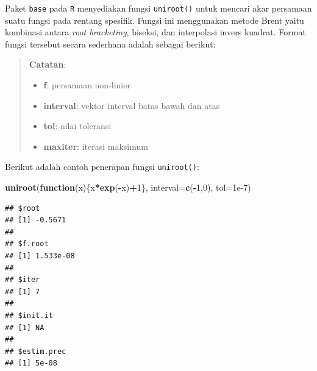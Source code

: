 \documentclass[
]{book}
\newenvironment{Shaded}{\begin{snugshade}}{\end{snugshade}}
\newcommand{\AttributeTok}[1]{\textcolor[rgb]{0.13,0.29,0.53}{#1}}
\newcommand{\ControlFlowTok}[1]{\textcolor[rgb]{0.13,0.29,0.53}{\textbf{#1}}}
\newcommand{\DecValTok}[1]{\textcolor[rgb]{0.00,0.00,0.81}{#1}}
\newcommand{\FloatTok}[1]{\textcolor[rgb]{0.00,0.00,0.81}{#1}}
\newcommand{\FunctionTok}[1]{\textcolor[rgb]{0.13,0.29,0.53}{\textbf{#1}}}
\newcommand{\NormalTok}[1]{#1}
\newcommand{\SpecialCharTok}[1]{\textcolor[rgb]{0.81,0.36,0.00}{\textbf{#1}}}
\providecommand{\tightlist}{%
  \setlength{\itemsep}{0pt}\setlength{\parskip}{0pt}}
\theoremstyle{definition}
\theoremstyle{definition}
\theoremstyle{definition}
\theoremstyle{definition}
\theoremstyle{remark}
\begin{document}
Paket \texttt{base} pada \texttt{R} menyediakan fungsi \texttt{uniroot()} untuk mencari akar persamaan suatu fungsi pada rentang spesifik. Fungsi ini menggunakan metode Brent yaitu kombinasi antara \emph{root bracketing}, biseksi, dan interpolasi invers kuadrat. Format fungsi tersebut secara sederhana adalah sebagai berikut:

\begin{Shaded}
\end{Shaded}

\begin{quote}
\textbf{Catatan}:

\begin{itemize}
\tightlist
\item
  \textbf{f}: persamaan non-linier
\item
  \textbf{interval}: vektor interval batas bawah dan atas
\item
  \textbf{tol}: nilai toleransi
\item
  \textbf{maxiter}: iterasi maksimum
\end{itemize}
\end{quote}

Berikut adalah contoh penerapan fungsi \texttt{uniroot()}:

\begin{Shaded}
\begin{Highlighting}[]
\FunctionTok{uniroot}\NormalTok{(}\ControlFlowTok{function}\NormalTok{(x)\{x}\SpecialCharTok{*}\FunctionTok{exp}\NormalTok{(}\SpecialCharTok{{-}}\NormalTok{x)}\SpecialCharTok{+}\DecValTok{1}\NormalTok{\},}
        \AttributeTok{interval=}\FunctionTok{c}\NormalTok{(}\SpecialCharTok{{-}}\DecValTok{1}\NormalTok{,}\DecValTok{0}\NormalTok{), }\AttributeTok{tol=}\FloatTok{1e{-}7}\NormalTok{)}
\end{Highlighting}
\end{Shaded}

\begin{verbatim}
## $root
## [1] -0.5671
## 
## $f.root
## [1] 1.533e-08
## 
## $iter
## [1] 7
## 
## $init.it
## [1] NA
## 
## $estim.prec
## [1] 5e-08
\end{verbatim}
\end{document}
